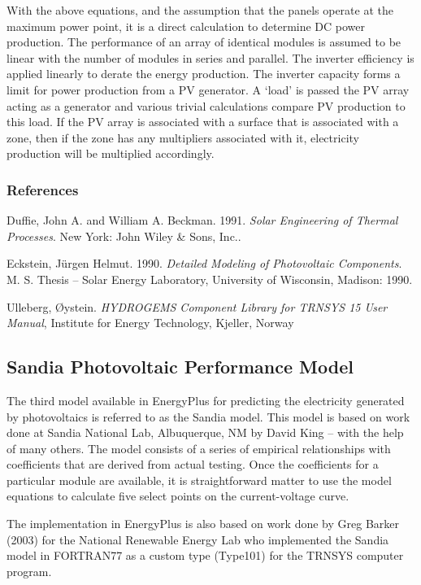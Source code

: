 With the above equations, and the assumption that the panels operate at the maximum power point, it is a direct calculation to determine DC power production. The performance of an array of identical modules is assumed to be linear with the number of modules in series and parallel. The inverter efficiency is applied linearly to derate the energy production. The inverter capacity forms a limit for power production from a PV generator. A `load' is passed the PV array acting as a generator and various trivial calculations compare PV production to this load. If the PV array is associated with a surface that is associated with a zone, then if the zone has any multipliers associated with it, electricity production will be multiplied accordingly.

\subsubsection{References}\label{references-035}

Duffie, John A. and William A. Beckman. 1991. \emph{Solar Engineering of Thermal Processes}. New York: John Wiley \& Sons, Inc..

Eckstein, Jürgen Helmut. 1990. \emph{Detailed Modeling of Photovoltaic Components}. M. S. Thesis -- Solar Energy Laboratory, University of Wisconsin, Madison: 1990.

Ulleberg, Øystein. \emph{HYDROGEMS Component Library for TRNSYS 15 User Manual}, Institute for Energy Technology, Kjeller, Norway \emph{~}

\subsection{Sandia Photovoltaic Performance Model}\label{sandia-photovoltaic-performance-model}

The third model available in EnergyPlus for predicting the electricity generated by photovoltaics is referred to as the Sandia model. This model is based on work done at Sandia National Lab, Albuquerque, NM by David King -- with the help of many others. The model consists of a series of empirical relationships with coefficients that are derived from actual testing. Once the coefficients for a particular module are available, it is straightforward matter to use the model equations to calculate five select points on the current-voltage curve.

The implementation in EnergyPlus is also based on work done by Greg Barker (2003) for the National Renewable Energy Lab who implemented the Sandia model in FORTRAN77 as a custom type (Type101) for the TRNSYS computer program.

